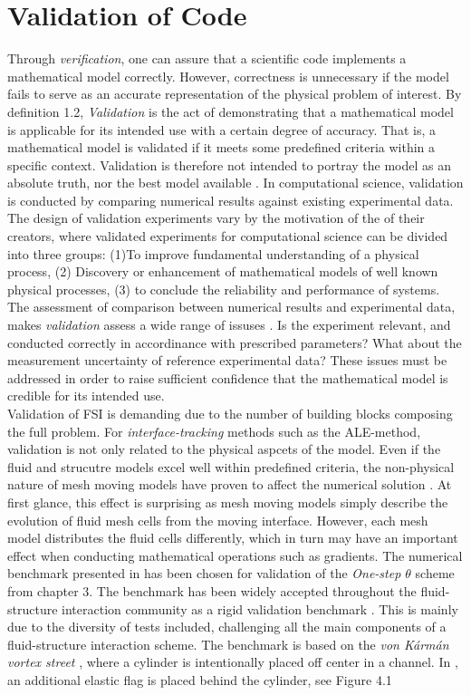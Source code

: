 \section{Validation of Code}
Through \textit{verification}, one can assure that a scientific code implements a mathematical model correctly. However, correctness is unnecessary if the model fails to serve as an accurate representation of the physical problem of interest. 
By definition 1.2, \textit{Validation} is the act of demonstrating that a mathematical model is applicable for its intended use with a certain degree of accuracy. That is, a mathematical model is validated if it meets some predefined criteria within a specific context. Validation is therefore not intended to portray the model as an absolute truth, nor the best model available \cite{Rykiel1996}. In computational science, validation is conducted by comparing numerical results against existing experimental data. The design of validation experiments vary by the motivation of the of their creators, where validated experiments for computational science can be divided into three groups\cite{Sommerville2006}: (1)To improve fundamental understanding of a physical process, (2) Discovery or enhancement of mathematical models of well known physical processes, (3) to conclude the reliability and performance of systems. The assessment of comparison between numerical results and experimental data, makes \textit{validation} assess a wide range of issuses \cite{Sommerville2006} . Is the experiment relevant, and  conducted correctly in accordinance with prescribed parameters? What about the measurement uncertainty of reference experimental data? These issues  must be addressed in order to raise sufficient confidence that the mathematical model is credible for its intended use. \\

Validation of FSI is demanding due to the number of building blocks composing the full problem. For \textit{interface-tracking} methods such as the ALE-method, validation is not only related to the physical aspcets of the model. Even if the fluid and strucutre models excel well within predefined criteria, the non-physical nature of mesh moving models have proven to affect the numerical solution \cite{Wickb}. At first glance, this effect is surprising as mesh moving models simply describe the evolution of fluid mesh cells from the moving interface. However, each mesh model distributes the fluid cells differently, which in turn may have an important effect when conducting mathematical operations such as gradients. 
 \newpage
The numerical benchmark presented in \cite{Hron2006} has been chosen for validation of the \textit{One-step $\theta$} scheme from chapter 3. The benchmark has been widely accepted throughout the fluid-structure interaction community as a rigid validation benchmark \cite{Wickb, Wick, V2013, Gatzhammer2014}. This is mainly due to the diversity of tests included, challenging all the main components of a fluid-structure interaction scheme. The benchmark is based on the \textit{von Kármán vortex street} \cite{White}, where a cylinder is intentionally placed off center in a channel. In \cite{Hron2006}, an additional elastic flag is placed behind the cylinder, see Figure 4.1

